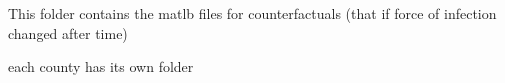 This folder contains the matlb files for counterfactuals (that if force of infection changed after time)

each county has its own folder 
